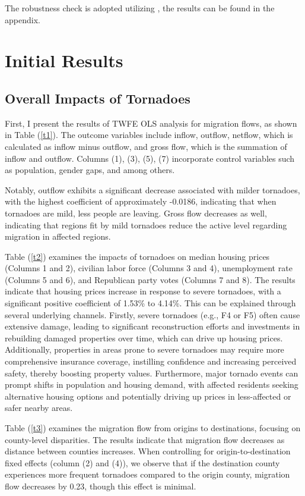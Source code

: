 \documentclass[letterpaper]{article}
\begin{document}
The robustness check is adopted utilizing \textcite{sun2021estimating}, the results can be found in the appendix.

\section{Initial Results}
\label{4}
\subsection{Overall Impacts of Tornadoes}
First, I present the results of TWFE OLS analysis for migration flows, as shown in Table (\ref{t1}). The outcome variables include inflow, outflow, netflow, which is calculated as inflow minus outflow, and gross flow, which is the summation of inflow and outflow. Columns (1), (3), (5), (7) incorporate control variables such as population, gender gaps, and among others. 

Notably, outflow exhibits a significant decrease associated with milder tornadoes, with the highest coefficient of approximately -0.0186, indicating that when tornadoes are mild, less people are leaving. Gross flow decreases as well, indicating that regions fit by mild tornadoes reduce the active level regarding migration in affected regions.

Table (\ref{t2}) examines the impacts of tornadoes on median housing prices (Columns 1 and 2), civilian labor force (Columns 3 and 4), unemployment rate (Columns 5 and 6), and Republican party votes (Columns 7 and 8). The results indicate that housing prices increase in response to severe tornadoes, with a significant positive coefficient of 1.53\% to 4.14\%. This can be explained through several underlying channels. Firstly, severe tornadoes (e.g., F4 or F5) often cause extensive damage, leading to significant reconstruction efforts and investments in rebuilding damaged properties over time, which can drive up housing prices. Additionally, properties in areas prone to severe tornadoes may require more comprehensive insurance coverage, instilling confidence and increasing perceived safety, thereby boosting property values. Furthermore, major tornado events can prompt shifts in population and housing demand, with affected residents seeking alternative housing options and potentially driving up prices in less-affected or safer nearby areas. 

Table (\ref{t3}) examines the migration flow from origins to destinations, focusing on county-level disparities. The results indicate that migration flow decreases as distance between counties increases. When controlling for origin-to-destination fixed effects (column (2) and (4)), we observe that if the destination county experiences more frequent tornadoes compared to the origin county, migration flow decreases by 0.23, though this effect is minimal.
\end{document}
